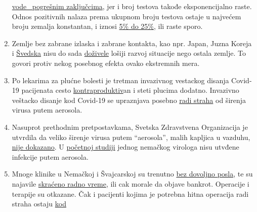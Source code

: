 \begin{enumerate}
  \href{https://multipolar-magazin.de/artikel/coronavirus-regierung-ignoriert-daten}{vode~
  pogrešnim zaključcima}, jer i broj testova takođe eksponencijalno
  raste. Odnos pozitivnih nalaza prema ukupnom broju testova ostaje u
  najvećem broju zemalja konstantan, i iznosi
  \href{https://swprs.org/rate-of-positive-covid19-tests/}{5\% do 25\%},
  ili raste sporo.
\item
  Zemlje bez zabrane izlaska i zabrane kontakta, kao npr. Japan, Juzna
  Koreja i
  \href{https://www.telegraph.co.uk/news/2020/04/03/coronavirus-swedish-experiment-could-prove-britain-wrong/}{Švedska}
  nisu do sada
  \href{https://www.japantimes.co.jp/news/2020/03/20/national/coronavirus-explosion-expected-japan/\#.Xo8poW5uJv0}{doživele}
  lošiji razvoj situacije nego ostala zemlje. To govori protiv nekog
  posebnog efekta ovako ekstremnih mera.
\item
  Po lekarima za plućne bolesti je tretman invazivnog vestackog disanja
  Covid-19 pacijenata cesto
  \href{https://www.faz.net/aktuell/gesellschaft/gesundheit/coronavirus/beatmung-beim-coronavirus-lungenfacharzt-im-gespraech-16714565.html}{kontraproduktiv}an
  i steti plucima dodatno. Invazivno veštacko disanje kod Covid-19 se
  upraznjava posebno \href{https://archive.is/KX5IQ}{radi straha} od
  širenja virusa putem aerosola.
\item
  Nasuprot prethodnim pretpostavkama, Svetska Zdravstvena Organizacija
  je utvrdila da veliko širenje virusa putem ``aerosola'', malih
  kapljica u vazduhu,
  \href{https://www.who.int/news-room/commentaries/detail/modes-of-transmission-of-virus-causing-covid-19-implications-for-ipc-precaution-recommendations}{nije
  dokazano}. U
  \href{https://www.zeit.de/zustimmung?url=https\%3A\%2F\%2Fwww.zeit.de\%2Fwissen\%2Fgesundheit\%2F2020-04\%2Fhendrik-streeck-covid-19-heinsberg-symptome-infektionsschutz-massnahmen-studie\%2Fkomplettansicht}{početnoj
  studiji} jednog nemačkog virologa nisu utvđene infekcije putem
  aerosola.
\item
  Mnoge klinike u Nemačkoj i Švajcarskoj su trenutno
  \href{https://www.spiegel.de/wirtschaft/unternehmen/trotz-corona-pandemie-warum-kliniken-jetzt-kurzarbeit-anmelden-a-3dc61bc9-fb12-4298-8022-bb4c2be39d7d}{bez
  dovoljno posla}, te su najavile
  \href{https://www.20min.ch/schweiz/news/story/Spitaeler-28949526}{skraćeno
  radno vreme}, ili cak morale da objave bankrot. Operacije i terapije
  su otkazane. Čak i pacijenti kojima je potrebna hitna operacija radi
  straha ostaju \href{https://www.youtube.com/watch?v=KucqjgM0P1E}{kod
}
\end{enumerate}
